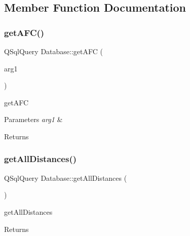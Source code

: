 \subsection{Member Function Documentation}
\mbox{\label{class_database_a00061fa9ad27c4a877ca9dee9cccdfd2}} 
\subsubsection{\texorpdfstring{get\+A\+F\+C()}{getAFC()}}
{\footnotesize\ttfamily Q\+Sql\+Query Database\+::get\+A\+FC (\begin{DoxyParamCaption}\item[{const Q\+String \&}]{arg1 }\end{DoxyParamCaption})}



get\+A\+FC 


\begin{DoxyParams}{Parameters}
{\em arg1} & \\
\hline
\end{DoxyParams}
\begin{DoxyReturn}{Returns}

\end{DoxyReturn}
\mbox{\label{class_database_a41a013a764f486b48461516634efa80f}} 
\subsubsection{\texorpdfstring{get\+All\+Distances()}{getAllDistances()}}
{\footnotesize\ttfamily Q\+Sql\+Query Database\+::get\+All\+Distances (\begin{DoxyParamCaption}{ }\end{DoxyParamCaption})}



get\+All\+Distances 

\begin{DoxyReturn}{Returns}

\end{DoxyReturn}
\mbox{\label{class_database_a36269f6c3e0e78bbea4baecaa98f2502}} 
